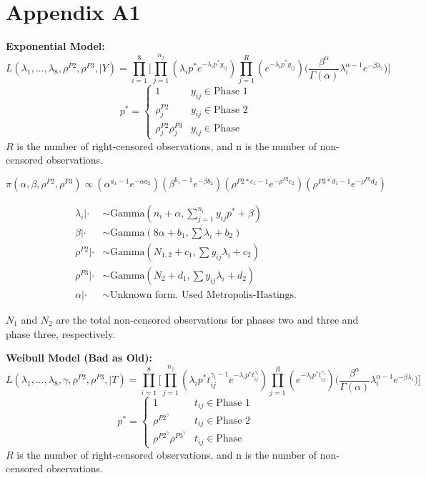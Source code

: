 \documentclass[12pt]{article}
\begin{document}
\section{Appendix A1}
\textbf{Exponential Model:}
\begin{equation*}
L(\lambda_1, ..., \lambda_8, \rho^{P2}, \rho^{P3}, \vert Y) = \prod_{i = 1}^8
  \Bigg[\prod_{j = 1}^{n_j}(\lambda_i p^*e^{-\lambda_i p^* y_{ij}})\prod_{j =
  1}^R(e^{-\lambda_i p^*
  y_{ij}})\Big(\frac{\beta^\alpha}{\Gamma(\alpha)}\lambda_i^{\alpha -
  1}e^{-\beta\lambda_i}\Big)\Bigg]
\end{equation*}
\[p^* =   \left\{
\begin{array}{ll}
      1 & y_{ij}\in \text{Phase 1} \\
      \rho_{j}^{P2} & y_{ij} \in \text{Phase 2} \\
      \rho_{j}^{P2} \rho_{j}^{P3} & y_{ij} \in \text{Phase }
\end{array}
\right. \]
$R$ is the number of right-censored observations, and n is the number of
non-censored observations.

\begin{equation*}
\pi(\alpha, \beta, \rho^{P2}, \rho^{P3}) \propto (\alpha^{a_1-1}e^{-\alpha
  a_2})(\beta^{b_1 - 1}e^{-\beta b_2})(\rho^{P2*c_1 - 1}e^{-\rho^{P2}
  c_2})(\rho^{P3*d_1 - 1}e^{-\rho^{P3} d_2})
\end{equation*}

\begin{align*}
\lambda_i|\cdot &\sim \text{Gamma}(n_i + \alpha, \sum_{j=1}^{n_i}y_{ij}p^* + \beta) \\
\beta|\cdot &\sim \text{Gamma}(8\alpha + b_1, \sum{\lambda_i} + b_2) \\
\rho^{P2}|\cdot &\sim \text{Gamma}(N_{1,2} + c_1, \sum{y_{ij}\lambda_i} + c_2) \\
\rho^{P3}|\cdot &\sim \text{Gamma}(N_{2} + d_1, \sum{y_{ij}\lambda_i} + d_2) \\
\alpha|\cdot &\sim \text{Unknown form.  Used Metropolis-Hastings.}
\end{align*}

$N_1$ and $N_2$ are the total non-censored observations for phases two and three
and phase three, respectively.

\textbf{Weibull Model (Bad as Old):}
\begin{equation*}
  L(\lambda_1, ..., \lambda_8, \gamma, \rho^{P2}, \rho^{P3}, \vert T) = \prod_{i =
    1}^8 \Bigg[\prod_{j = 1}^{n_j}(\lambda_i p^*t_{ij}^{\gamma_i-1} e^{-\lambda_i
    p^* t_{ij}^{\gamma_i}})\prod_{j = 1}^R(e^{-\lambda_i p^*
    t_{ij}^{\gamma_i}})\Big(\frac{\beta^\alpha}{\Gamma(\alpha)}\lambda_i^{\alpha -
    1}e^{-\beta\lambda_i}\Big)\Bigg]
\end{equation*}
\[p^* =   \left\{
\begin{array}{ll}
      1 & t_{ij}\in \text{Phase 1} \\
      \rho^{P2^\gamma} & t_{ij} \in \text{Phase 2} \\
      \rho^{P2^\gamma} \rho^{P3^\gamma} & t_{ij} \in \text{Phase }
\end{array}
\right. \]
$R$ is the number of right-censored observations, and n is the number of
non-censored observations.
\end{document}
